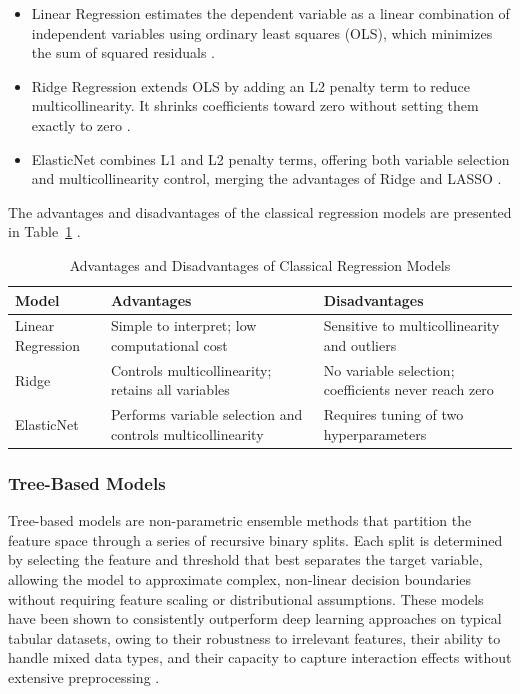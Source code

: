 \documentclass[final, 9pt, twocolumn]{saucis}
\begin{document}
\begin{itemize}
    \item Linear Regression estimates the dependent variable as a 
    linear combination of independent variables using ordinary least 
    squares (OLS), which minimizes the sum of squared residuals 
    \cite{method7}.
    \item Ridge Regression extends OLS by adding an L2 penalty term to reduce multicollinearity. It shrinks coefficients toward zero without setting them exactly to zero \cite{method8}.
    \item ElasticNet combines L1 and L2 penalty terms, offering both variable selection and multicollinearity control, merging the advantages of Ridge and LASSO \cite{method8}.
\end{itemize}

The advantages and disadvantages of the classical regression models are presented in Table~\ref{tab:classical_pros_cons} .

\begin{table}[htbp]
\centering
\caption{Advantages and Disadvantages of Classical Regression Models}
\label{tab:classical_pros_cons}
\small
\begin{tabular}{p{1.2cm} p{3.15cm} p{3.15cm}}
\hline
Model & Advantages & Disadvantages \\
\hline
Linear Regression
& Simple to interpret; low computational cost
& Sensitive to multicollinearity and outliers \\
Ridge
& Controls multicollinearity; retains all variables
& No variable selection; coefficients never reach zero \\
ElasticNet
& Performs variable selection and controls multicollinearity
& Requires tuning of two hyperparameters \\
\hline
\end{tabular}
\end{table}

\subsubsection{Tree-Based Models}

Tree-based models are non-parametric ensemble methods that partition the feature space through a series of recursive binary splits. Each split is determined by selecting the feature and threshold that best separates the target variable, allowing the model to approximate complex, non-linear decision boundaries without requiring feature scaling or distributional assumptions. These models have been shown to consistently outperform deep learning approaches on typical tabular datasets, owing to their robustness to irrelevant features, their ability to handle mixed data types, and their capacity to capture interaction effects without extensive preprocessing \cite{method10}.
\end{document}
